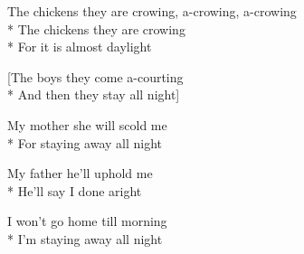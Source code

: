 

\versemark
The chickens they are crowing, a-crowing, a-crowing\\*
The chickens they are crowing\\*
For it is almost daylight

[The boys they come a-courting\simile\\*
And then they stay all night]

\versemark
My mother she will scold me\simile\\*
For staying away all night

\versemark
My father he’ll uphold me\simile\\*
He’ll say I done aright

\versemark
I won’t go home till morning\simile\\*
I’m staying away all night\repeatfirst

